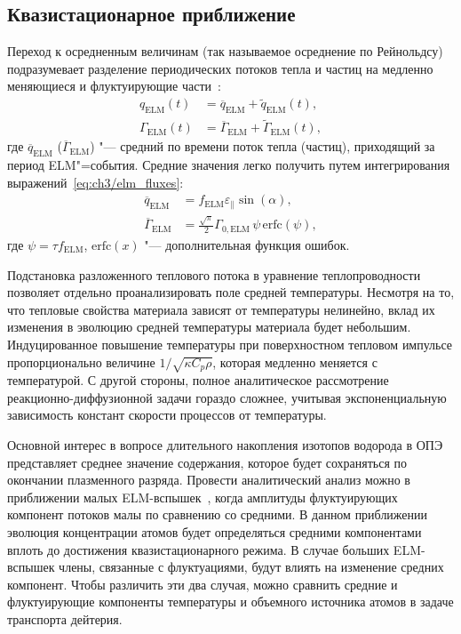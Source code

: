 \subsection{Квазистационарное приближение}
Переход к осредненным величинам (так называемое осреднение по Рейнольдсу) подразумевает разделение периодических потоков тепла и частиц на медленно меняющиеся и флуктуирующие части~\cite{Marenkov2012a}:
\begin{subequations}
	\label{eq:ch3/periodic_funcs}
	\begin{align}
		q_{\mathrm{ELM}}(t)      & =\overline{q}_{\mathrm{ELM}} + \widetilde{q}_{\mathrm{ELM}}(t),\label{eq:decomp_heat} \\
		\Gamma_{\mathrm{ELM}}(t) & =\overline{\Gamma}_{\mathrm{ELM}} + \widetilde{\Gamma}_{\mathrm{ELM}}(t),
	\end{align}
\end{subequations}
где $\overline{q}_{\mathrm{ELM}}$ ($\overline{\Gamma}_{\mathrm{ELM}}$) "--- средний по времени поток тепла (частиц), приходящий за период ELM"=события. Средние значения легко получить путем интегрирования выражений~\cref{eq:ch3/elm_fluxes}:
\begin{subequations}
	\label{eq:ch3/av_funcs}
	\begin{align}
		\overline{q}_{\mathrm{ELM}}      & =f_{\mathrm{ELM}}\varepsilon_\parallel\sin(\alpha)\label{eq:av_heat},                                  \\
		\overline{\Gamma}_{\mathrm{ELM}} & =\frac{\sqrt{\pi}}{2} \Gamma_{0,\mathrm{ELM}}\,\psi\,\mathrm{erfc}\left(\psi\right),\label{eq:av_flux}
	\end{align}
\end{subequations}
где $\psi=\tau f_{\mathrm{ELM}}$, $\mathrm{erfc}(x)$ "--- дополнительная функция ошибок.

Подстановка разложенного теплового потока в уравнение теплопроводности позволяет отдельно проанализировать поле средней температуры. Несмотря на то, что тепловые свойства материала зависят от температуры нелинейно, вклад их изменения в эволюцию средней температуры материала будет небольшим. Индуцированное повышение температуры при поверхностном тепловом импульсе пропорционально величине $1/\sqrt{\kappa C_p \rho}$, которая медленно меняется с температурой. С другой стороны, полное аналитическое рассмотрение реакционно-диффузионной задачи гораздо сложнее, учитывая экспоненциальную зависимость констант скорости процессов от температуры.

Основной интерес в вопросе длительного накопления изотопов водорода в ОПЭ представляет среднее значение содержания, которое будет сохраняться по окончании плазменного разряда. Провести аналитический анализ можно в приближении малых ELM-вспышек~\cite{Marenkov2012a}, когда амплитуды флуктуирующих компонент потоков малы по сравнению со средними. В данном приближении эволюция концентрации атомов будет определяться средними компонентами вплоть до достижения квазистационарного режима. В случае больших ELM-вспышек члены, связанные с флуктуациями, будут влиять на изменение средних компонент. Чтобы различить эти два случая, можно сравнить средние и флуктуирующие компоненты температуры и объемного источника атомов в задаче транспорта дейтерия.

